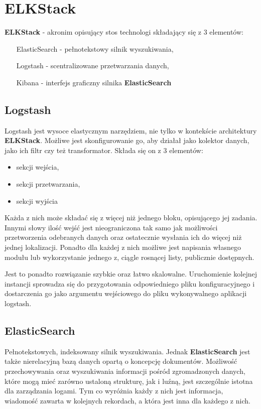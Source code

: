 \section{ELKStack}
\label{chapter:application:elkstack}

\textbf{ELKStack} - akronim opisujący stos technologi składający się z 3 elementów:
\begin{itemize}
    \item[ElasticSearch] - pełnotekstowy silnik wyszukiwania,
    \item[Logstash] - scentralizowane przetwarzania danych,
    \item[Kibana] - interfejs graficzny silnika \textbf{ElasticSearch}
\end{itemize}

\subsection{Logstash}
    Logstash jest wysoce elastycznym narzędziem, nie tylko w kontekście architektury \textbf{ELKStack}.
    Możliwe jest skonfigurowanie go, aby działał jako kolektor danych, jako ich filtr czy też
    transformator. Składa się on z 3 elementów:
    \begin{itemize}
        \item sekcji wejścia,
        \item sekcji przetwarzania,
        \item sekcji wyjścia
    \end{itemize}
    Każda z nich może składać się z więcej niż jednego bloku, opisującego jej zadania.
    Innymi słowy ilość wejść jest nieograniczona tak samo jak możliwości przetworzenia
    odebranych danych oraz ostatecznie wysłania ich do więcej niż jednej lokalizacji.
    Ponadto dla każdej z nich możliwe jest napisania własnego modułu lub wykorzystanie
    jednego z, ciągle rosnącej listy, publicznie dostępnych.
    
    Jest to ponadto rozwiązanie szybkie oraz łatwo skalowalne. Uruchomienie kolejnej
    instancji sprowadza się do przygotowania odpowiedniego pliku konfiguracyjnego
    i dostarczenia go jako argumentu wejściowego do pliku wykonywalnego aplikacji logstash.
    

\subsection{ElasticSearch}
    Pełnotekstowych, indeksowany silnik wyszukiwania. Jednak \textbf{ElasticSearch} jest także
    nierelacyjną bazą danych opartą o koncepcję dokumentów. Możliwość przechowywania oraz wyszukiwania
    informacji pośród zgromadzonych danych, które mogą mieć zarówno ustaloną strukturę, jak i  luźną, jest
    szczególnie istotna dla zarządzania logami. Tym co wyróżnia każdy z nich jest informacja, wiadomość
    zawarta w kolejnych rekordach, a która jest inna dla każdego z nich. 
    
